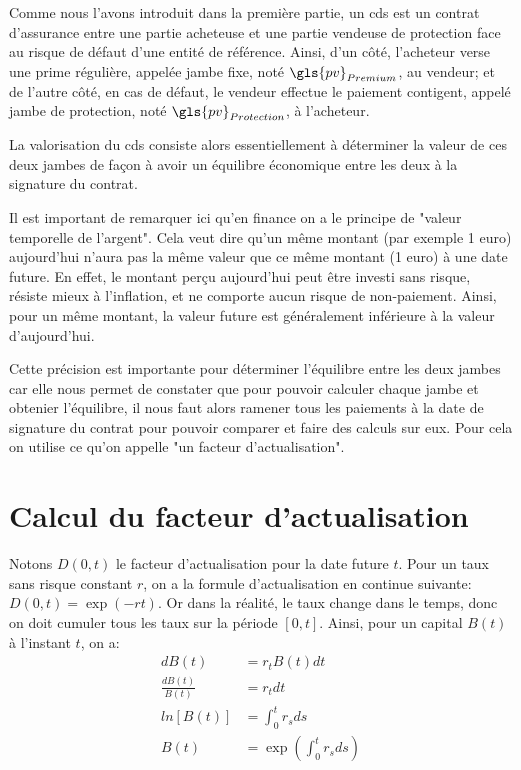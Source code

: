Comme nous l'avons introduit dans la première partie, un \gls{cds} est un contrat d'assurance entre une partie acheteuse et une partie vendeuse de protection face au risque de défaut d'une entité de référence. Ainsi, d'un côté, l'acheteur verse une prime régulière, appelée jambe fixe, noté $\gls{pv}_{Premium}$, au vendeur; et de l'autre côté, en cas de défaut, le vendeur effectue le paiement contigent, appelé jambe de protection, noté $\gls{pv}_{Protection}$, à l'acheteur.

La valorisation du \gls{cds} consiste alors essentiellement à déterminer la valeur de ces deux jambes de façon à avoir un équilibre économique entre les deux à la signature du contrat.

Il est important de remarquer ici qu'en finance on a le principe de "valeur temporelle de l'argent". Cela veut dire qu'un même montant (par exemple 1 euro) aujourd'hui n'aura pas la même valeur que ce même montant (1 euro) à une date future. En effet, le montant perçu aujourd'hui peut être investi sans risque, résiste mieux à l'inflation, et ne comporte aucun risque de non-paiement. Ainsi, pour un même montant, la valeur future est généralement inférieure à la valeur d'aujourd'hui.

Cette précision est importante pour déterminer l'équilibre entre les deux jambes car elle nous permet de constater que pour pouvoir calculer chaque jambe et obtenier l'équilibre, il nous faut alors ramener tous les paiements à la date de signature du contrat pour pouvoir comparer et faire des calculs sur eux. Pour cela on utilise ce qu'on appelle "un facteur d'actualisation".


\section{Calcul du facteur d'actualisation}

Notons $D(0, t)$ le facteur d'actualisation pour la date future $t$. Pour un taux sans risque constant $r$, on a la formule d'actualisation en continue suivante: $D(0, t) = \exp(-rt)$.
Or dans la réalité, le taux change dans le temps, donc on doit cumuler tous les taux sur la période $[0, t]$. Ainsi, pour un capital $B(t)$ à l'instant $t$, on a:
\begin{align*}
    dB(t) &= r_t B(t) dt \\
    \frac{dB(t)}{B(t)} &= r_tdt \\
    ln[B(t)] &= \int_0^t r_s ds \\
    B(t) &= \exp(\int_0^t r_s ds)
\end{align*}

